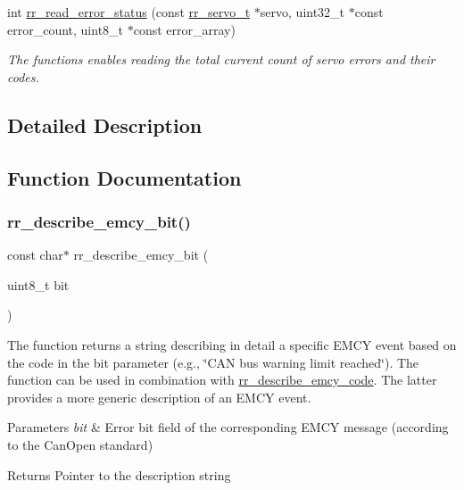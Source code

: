 \begin{DoxyCompactItemize}
int \hyperlink{group___err_ga0803e0fab3e22b1bcb3f51aa393328b4}{rr\+\_\+read\+\_\+error\+\_\+status} (const \hyperlink{structrr__servo__t}{rr\+\_\+servo\+\_\+t} $\ast$servo, uint32\+\_\+t $\ast$const error\+\_\+count, uint8\+\_\+t $\ast$const error\+\_\+array)
\begin{DoxyCompactList}\small\item\em The functions enables reading the total current count of servo errors and their codes. \end{DoxyCompactList}\end{DoxyCompactItemize}


\subsection{Detailed Description}


\subsection{Function Documentation}
\mbox{\label{group___err_gaa949cec80a64afa06ed9816fe1132888}} 
\subsubsection{\texorpdfstring{rr\+\_\+describe\+\_\+emcy\+\_\+bit()}{rr\_describe\_emcy\_bit()}}
{\footnotesize\ttfamily const char$\ast$ rr\+\_\+describe\+\_\+emcy\+\_\+bit (\begin{DoxyParamCaption}\item[{uint8\+\_\+t}]{bit }\end{DoxyParamCaption})}



The function returns a string describing in detail a specific E\+M\+CY event based on the code in the \textquotesingle{}bit\textquotesingle{} parameter (e.\+g., \char`\"{}\+C\+A\+N bus warning limit reached\char`\"{}). The function can be used in combination with \hyperlink{group___err_ga2a5b7ff5f0e37ae3a856757cff7ced4f}{rr\+\_\+describe\+\_\+emcy\+\_\+code}. The latter provides a more generic description of an E\+M\+CY event. 


\begin{DoxyParams}{Parameters}
{\em bit} & Error bit field of the corresponding E\+M\+CY message (according to the Can\+Open standard) \\
\hline
\end{DoxyParams}
\begin{DoxyReturn}{Returns}
Pointer to the description string 
\end{DoxyReturn}
\mbox{\label{group___err_ga2a5b7ff5f0e37ae3a856757cff7ced4f}} 
